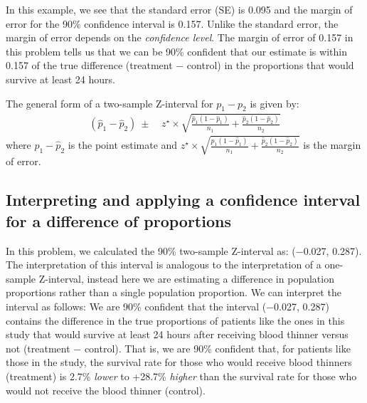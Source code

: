 In this example, we see that the standard error (SE) is 0.095 and the margin of error for the 90\% confidence interval is 0.157.   Unlike the standard error, the margin of error depends on the \emph{confidence level}.  The margin of error of 0.157 in this problem tells us that we can be 90\% confident that our estimate is within 0.157 of the true difference (treatment $-$ control) in the proportions that would survive at least 24 hours.  

The general form of a two-sample Z-interval for $p_1 - p_2$ is given by:
\begin{align*}
(\hat{p}_{1} - \hat{p}_{2}) \ \pm&\ z^{\star} \times \sqrt{\frac{\hat{p}_1(1-\hat{p}_1)}{n_1} + \frac{\hat{p}_2(1-\hat{p}_2)}{n_2}}
\end{align*}
where $\hat{p}_{1} - \hat{p}_{2}$ is the point estimate and $z^{\star} \times \sqrt{\frac{\hat{p}_1(1-\hat{p}_1)}{n_1} + \frac{\hat{p}_2(1-\hat{p}_2)}{n_2}}$ is the margin of error.


\D{\newpage}

\subsection{Interpreting and applying a confidence interval for a difference of proportions}

In this problem, we calculated the 90\% two-sample Z-interval as: ($-$0.027, 0.287).  The interpretation of this interval is analogous to the interpretation of a one-sample Z-interval, instead here we are estimating a difference in population proportions rather than a single population proportion.  We can interpret the interval as follows:  We are 90\% confident that the interval ($-$0.027, 0.287) contains the difference in the true proportions of patients like the ones in this study that would survive at least 24 hours after receiving blood thinner versus not (treatment $-$ control).  That is, we are 90\% confident that, for patients like those in the study, the survival rate for those who would receive blood thinners (treatment) is 2.7\% \emph{lower} to +28.7\% \emph{higher} than the survival rate for those who would not receive the blood thinner (control).  

